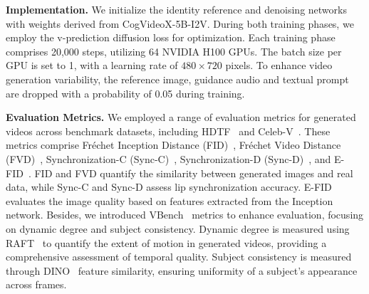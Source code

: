 \noindent\textbf{Implementation.}
We initialize the identity reference and denoising networks with weights derived from CogVideoX-5B-I2V\cite{yang2024cogvideox}. During both training phases, we employ the v-prediction diffusion loss\cite{salimans2022progressive} for optimization. Each training phase comprises 20,000 steps, utilizing 64 NVIDIA H100 GPUs. The batch size per GPU is set to 1, with a learning rate of \(480 \times 720\) pixels. To enhance video generation variability, the reference image, guidance audio and textual prompt are dropped with a probability of 0.05 during training.

\noindent\textbf{Evaluation Metrics.}
We employed a range of evaluation metrics for generated videos across benchmark datasets, including HDTF~\cite{zhang2021flow} and Celeb-V~\cite{zhu2022celebvhq}. 
These metrics comprise Fréchet Inception Distance (FID)~\cite{Seitzer2020FID}, Fréchet Video Distance (FVD)~\cite{unterthiner2018towards}, Synchronization-C (Sync-C)~\cite{Chung16a}, Synchronization-D (Sync-D)~\cite{Chung16a}, and E-FID~\cite{tian2024emo}. 
FID and FVD quantify the similarity between generated images and real data, while Sync-C and Sync-D assess lip synchronization accuracy. E-FID evaluates the image quality based on features extracted from the Inception network.
Besides, we introduced VBench~\cite{huang2023vbench} metrics to enhance evaluation, focusing on dynamic degree and subject consistency. 
Dynamic degree is measured using RAFT~\cite{teed2020raft} to quantify the extent of motion in generated videos, providing a comprehensive assessment of temporal quality.
Subject consistency is measured through DINO~\cite{caron2021emerging} feature similarity, ensuring uniformity of a subject's appearance across frames. 



